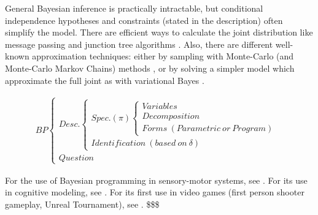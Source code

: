 General Bayesian inference is practically intractable, but conditional independence hypotheses and constraints (stated in the description) often simplify the model. There are efficient ways to calculate the joint distribution like message passing and junction tree algorithms \citep{Pearl,Nai04,Koller}. Also, there are different well-known approximation techniques: either by sampling with Monte-Carlo (and Monte-Carlo Markov Chains) methods \citep{MacKay,Andrieu}, or by solving a simpler model which approximate the full joint as with variational Bayes \citep{Beal}.

\begin{eqnarray*}
BP
\begin{cases}
Desc.
    \begin{cases}
    Spec. (\pi)
        \begin{cases}
        Variables\\
        Decomposition\\
        Forms\ (Parametric\ or\ Program)
        \end{cases}\\
    Identification\ (based\ on\ \delta)
    \end{cases}\\
Question
\end{cases}
\end{eqnarray*}


For the use of Bayesian programming in sensory-motor systems, see \citep{PRDMSMS}. For its use in cognitive modeling, see \citep{Colas10}. For its first use in video games (first person shooter gameplay, Unreal Tournament), see \citep{LeHy04}. \$\$\$



